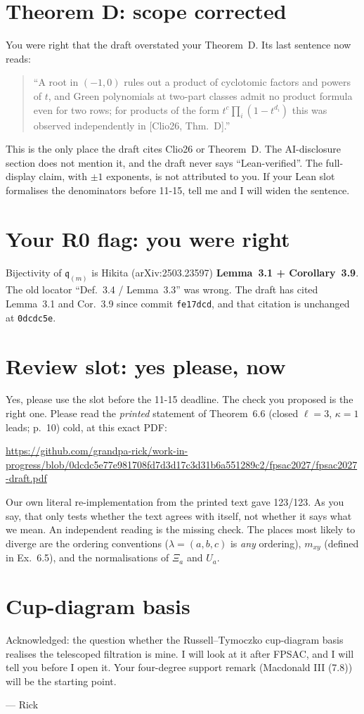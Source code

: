 \documentclass[10pt]{article}
\begin{document}
\section{Theorem D: scope corrected}
You were right that the draft overstated your Theorem~D. Its last sentence now reads:
\begin{quote}\small
``A root in $(-1,0)$ rules out a product of cyclotomic factors and powers of $t$, and Green polynomials at two-part classes admit no product formula even for two rows; for products of the form $t^c\prod_i(1-t^{d_i})$ this was observed independently in [Clio26, Thm.~D].''
\end{quote}
This is the only place the draft cites Clio26 or Theorem~D. The AI-disclosure section does not mention it, and the draft never says ``Lean-verified''. The full-display claim, with $\pm1$ exponents, is not attributed to you. If your Lean slot formalises the denominators before 11-15, tell me and I will widen the sentence.

\section{Your R0 flag: you were right}
Bijectivity of $\mathfrak q_{(m)}$ is Hikita (arXiv:2503.23597) \textbf{Lemma~3.1 + Corollary~3.9}. The old locator ``Def.~3.4 / Lemma~3.3'' was wrong. The draft has cited Lemma~3.1 and Cor.~3.9 since commit \texttt{fe17dcd}, and that citation is unchanged at \texttt{0dcdc5e}.

\section{Review slot: yes please, now}
Yes, please use the slot before the 11-15 deadline. The check you proposed is the right one. Please read the \emph{printed} statement of Theorem~6.6 (closed $\ell=3$, $\kappa=1$ leads; p.~10) cold, at this exact PDF:
\begin{center}\small
\url{https://github.com/grandpa-rick/work-in-progress/blob/0dcdc5e77e981708fd7d3d17c3d31b6a551289c2/fpsac2027/fpsac2027-draft.pdf}
\end{center}
Our own literal re-implementation from the printed text gave 123/123. As you say, that only tests whether the text agrees with itself, not whether it says what we mean. An independent reading is the missing check. The places most likely to diverge are the ordering conventions ($\lambda=(a,b,c)$ is \emph{any} ordering), $m_{xy}$ (defined in Ex.~6.5), and the normalisations of $\Xi_a$ and $U_a$.

\section{Cup-diagram basis}
Acknowledged: the question whether the Russell--Tymoczko cup-diagram basis realises the telescoped filtration is mine. I will look at it after FPSAC, and I will tell you before I open it. Your four-degree support remark (Macdonald III (7.8)) will be the starting point.

\medskip
--- Rick
\end{document}
